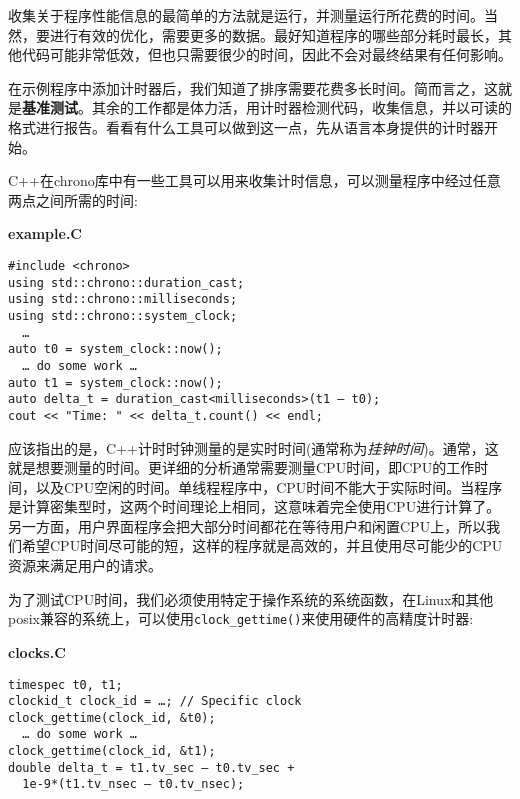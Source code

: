 
收集关于程序性能信息的最简单的方法就是运行，并测量运行所花费的时间。当然，要进行有效的优化，需要更多的数据。最好知道程序的哪些部分耗时最长，其他代码可能非常低效，但也只需要很少的时间，因此不会对最终结果有任何影响。

在示例程序中添加计时器后，我们知道了排序需要花费多长时间。简而言之，这就是\textbf{基准测试}。其余的工作都是体力活，用计时器检测代码，收集信息，并以可读的格式进行报告。看看有什么工具可以做到这一点，先从语言本身提供的计时器开始。


C++在chrono库中有一些工具可以用来收集计时信息，可以测量程序中经过任意两点之间所需的时间:

\noindent
\textbf{example.C}
\begin{lstlisting}[style=styleCXX]
#include <chrono>
using std::chrono::duration_cast;
using std::chrono::milliseconds;
using std::chrono::system_clock;
  …
auto t0 = system_clock::now();
  … do some work …
auto t1 = system_clock::now();
auto delta_t = duration_cast<milliseconds>(t1 – t0);
cout << "Time: " << delta_t.count() << endl;
\end{lstlisting}

应该指出的是，C++计时时钟测量的是实时时间(通常称为\textit{挂钟时间})。通常，这就是想要测量的时间。更详细的分析通常需要测量CPU时间，即CPU的工作时间，以及CPU空闲的时间。单线程程序中，CPU时间不能大于实际时间。当程序是计算密集型时，这两个时间理论上相同，这意味着完全使用CPU进行计算了。另一方面，用户界面程序会把大部分时间都花在等待用户和闲置CPU上，所以我们希望CPU时间尽可能的短，这样的程序就是高效的，并且使用尽可能少的CPU资源来满足用户的请求。



为了测试CPU时间，我们必须使用特定于操作系统的系统函数，在Linux和其他posix兼容的系统上，可以使用\texttt{clock\_gettime()}来使用硬件的高精度计时器:

\noindent
\textbf{clocks.C}
\begin{lstlisting}[style=styleCXX]
timespec t0, t1;
clockid_t clock_id = …; // Specific clock
clock_gettime(clock_id, &t0);
  … do some work …
clock_gettime(clock_id, &t1);
double delta_t = t1.tv_sec – t0.tv_sec +
  1e-9*(t1.tv_nsec – t0.tv_nsec);
\end{lstlisting}

